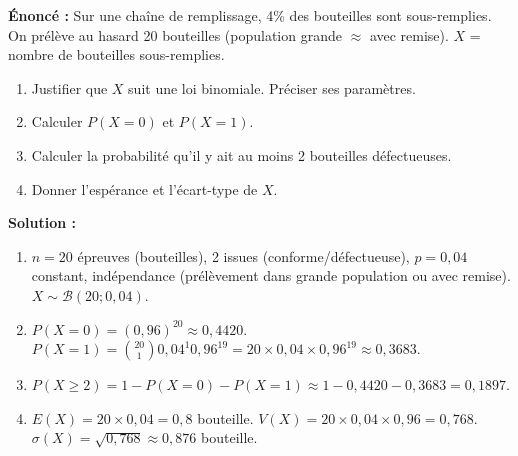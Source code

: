 \documentclass[11pt]{article}
\begin{document}
\begin{exoresolu}
\textbf{Énoncé :} Sur une chaîne de remplissage, 4\% des bouteilles sont sous-remplies. On prélève au hasard 20 bouteilles (population grande $\approx$ avec remise). $X$ = nombre de bouteilles sous-remplies.
\begin{enumerate}
    \item Justifier que $X$ suit une loi binomiale. Préciser ses paramètres.
    \item Calculer $P(X=0)$ et $P(X=1)$.
    \item Calculer la probabilité qu'il y ait au moins 2 bouteilles défectueuses.
    \item Donner l'espérance et l'écart-type de $X$.
\end{enumerate}
\textbf{Solution :}
\begin{enumerate}
    \item $n=20$ épreuves (bouteilles), 2 issues (conforme/défectueuse), $p=0,04$ constant, indépendance (prélèvement dans grande population ou avec remise). $X \sim \mathcal{B}(20; 0,04)$.
    \item $P(X=0) = (0,96)^{20} \approx 0,4420$.
    $P(X=1) = \binom{20}{1} 0,04^1 0,96^{19} = 20 \times 0,04 \times 0,96^{19} \approx 0,3683$.
    \item $P(X \ge 2) = 1 - P(X=0) - P(X=1) \approx 1 - 0,4420 - 0,3683 = 0,1897$.
    \item $E(X) = 20 \times 0,04 = 0,8$ bouteille.
    $V(X) = 20 \times 0,04 \times 0,96 = 0,768$.
    $\sigma(X) = \sqrt{0,768} \approx 0,876$ bouteille.
\end{enumerate}
\end{exoresolu}
\end{document}
